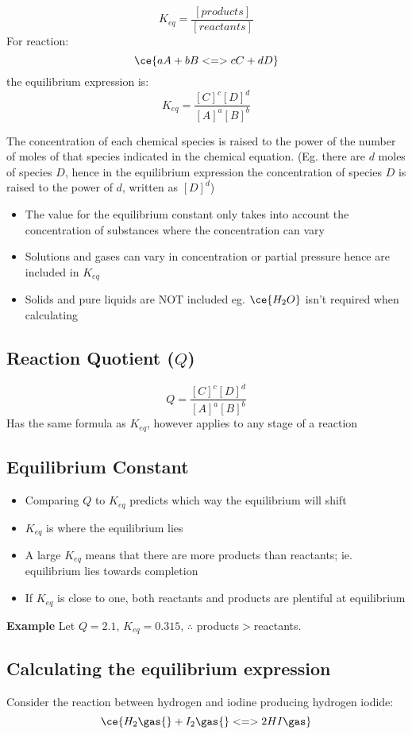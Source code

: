 	$$K_{eq} = \frac{[products]}{[reactants]}$$
	For reaction:
	$$\ce{aA + bB <=> cC + dD}$$
	the equilibrium expression is:
	$$K_{eq}=\frac{[C]^{c}[D]^{d}}{[A]^a[B]^b}$$

	The concentration of each chemical species is raised to the power of the number of moles of that species indicated in the chemical equation. (Eg. there are $d$ moles of species $D$, hence in the equilibrium expression the concentration of species $D$ is raised to the power of $d$, written as $[D]^d$)

	\begin{itemize}
		\item The value for the equilibrium constant only takes into account the concentration of substances where the concentration can vary
		\item Solutions and gases can vary in concentration or partial pressure hence are included in $K_{eq}$
		\item Solids and pure liquids are NOT included eg. $\ce{H_2O}$ isn't required when calculating
	\end{itemize}

	\subsection{Reaction Quotient ($Q$)}
		$$Q=\frac{[C]^{c}[D]^{d}}{[A]^a[B]^b}$$
		Has the same formula as $K_{eq}$, however applies to any stage of a reaction
		
	\subsection{Equilibrium Constant}
		\begin{itemize}
			\item Comparing $Q$ to $K_{eq}$ predicts which way the equilibrium will shift
			\item $K_{eq}$ is where the equilibrium lies
			\item A large $K_{eq}$ means that there are more products than reactants; ie. equilibrium lies towards completion
			\item If $K_{eq}$ is close to one, both reactants and products are plentiful at equilibrium
		\end{itemize}
		\textbf{Example} Let $Q=2.1$, $K_{eq}=0.315$, $\therefore$ products$>$reactants.

	\subsection{Calculating the equilibrium expression}
		Consider the reaction between hydrogen and iodine producing hydrogen iodide:
		$$\ce{H_{2}\gas{} + I_{2}\gas{} <=> 2HI\gas}$$

